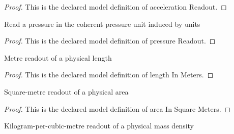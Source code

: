 \begin{proof}
  This is the declared model definition of acceleration Readout.
\end{proof}
\begin{definition}
  \label{def:physics:phyx-mini-0665:phyxminiproblems-problemphyxmini0665-pressurereadout}
  Read a pressure in the coherent pressure unit induced by units
\end{definition}
\begin{proof}
  This is the declared model definition of pressure Readout.
\end{proof}
\begin{definition}
  \label{def:physics:phyx-mini-0665:phyxminiproblems-problemphyxmini0665-lengthinmeters}
  Metre readout of a physical length
\end{definition}
\begin{proof}
  This is the declared model definition of length In Meters.
\end{proof}
\begin{definition}
  \label{def:physics:phyx-mini-0665:phyxminiproblems-problemphyxmini0665-areainsquaremeters}
  Square-metre readout of a physical area
\end{definition}
\begin{proof}
  This is the declared model definition of area In Square Meters.
\end{proof}
\begin{definition}
  \label{def:physics:phyx-mini-0665:phyxminiproblems-problemphyxmini0665-densityinkilogramspercubicmeter}
  Kilogram-per-cubic-metre readout of a physical mass density
\end{definition}
